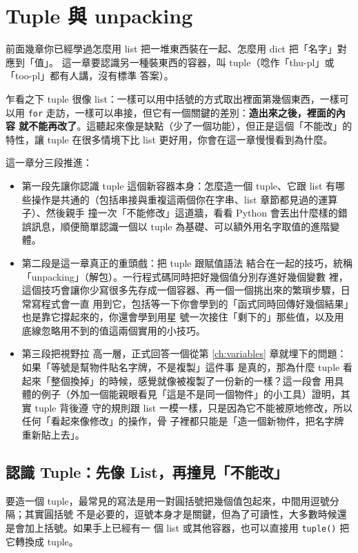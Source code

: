 \chapter{Tuple 與 unpacking}
\label{ch:tuples}

前面幾章你已經學過怎麼用 list 把一堆東西裝在一起、怎麼用 dict 把「名字」對應到「值」。
這一章要認識另一種裝東西的容器，叫 tuple（唸作「thu-pl」或「too-pl」都有人講，沒有標準
答案）。

乍看之下 tuple 很像 list：一樣可以用中括號的方式取出裡面第幾個東西，一樣可以用
\texttt{for} 走訪，一樣可以串接，但它有一個關鍵的差別：\textbf{造出來之後，裡面的內容
就不能再改了}。這聽起來像是缺點（少了一個功能），但正是這個「不能改」的特性，讓 tuple
在很多情境下比 list 更好用，你會在這一章慢慢看到為什麼。

這一章分三段推進：

\begin{itemize}
\item 第一段先讓你認識 tuple 這個新容器本身：怎麼造一個 tuple、它跟 list
有哪些操作是共通的（包括串接與重複這兩個你在字串、list 章節都見過的運算子）、然後親手
撞一次「不能修改」這道牆，看看 Python 會丟出什麼樣的錯誤訊息，順便簡單認識一個以 tuple
為基礎、可以額外用名字取值的進階變體。
\item 第二段是這一章真正的重頭戲：把 tuple 跟賦值語法
結合在一起的技巧，統稱「unpacking」（解包）。一行程式碼同時把好幾個值分別存進好幾個變數
裡，這個技巧會讓你少寫很多先存成一個容器、再一個一個挑出來的繁瑣步驟，日常寫程式會一直
用到它，包括等一下你會學到的「函式同時回傳好幾個結果」也是靠它撐起來的，你還會學到用星
號一次接住「剩下的」那些值，以及用底線忽略用不到的值這兩個實用的小技巧。
\item 第三段把視野拉
高一層，正式回答一個從第 \ref{ch:variables} 章就埋下的問題：如果「等號是幫物件貼名字牌，不是複製」這件事
是真的，那為什麼 tuple 看起來「整個換掉」的時候，感覺就像被複製了一份新的一樣？這一段會
用具體的例子（外加一個能親眼看見「這是不是同一個物件」的小工具）證明，其實 tuple 背後遵
守的規則跟 list 一模一樣，只是因為它不能被原地修改，所以任何「看起來像修改」的操作，骨
子裡都只能是「造一個新物件，把名字牌重新貼上去」。
\end{itemize}

\section{認識 Tuple：先像 List，再撞見「不能改」}
\label{sec:tuple-basics}

要造一個 tuple，最常見的寫法是用一對圓括號把幾個值包起來，中間用逗號分隔；其實圓括號
不是必要的，逗號本身才是關鍵，但為了可讀性，大多數時候還是會加上括號。如果手上已經有一
個 list 或其他容器，也可以直接用 \texttt{tuple()} 把它轉換成 tuple。

